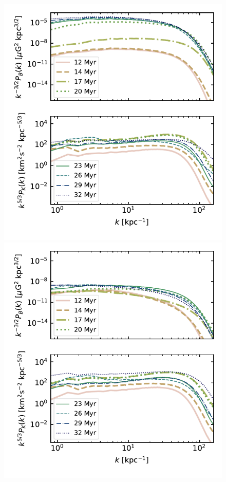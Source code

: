 \documentclass[preprint2]{aastex63}
\begin{document}
\begin{figure}
  \includegraphics[trim=0.5cm 0.2cm 0.3cm 0.0cm, clip=true,width=\columnwidth]{figs/0_5pcPm0e-4_0kpower.pdf}
  \includegraphics[trim=0.5cm 0.5cm 0.3cm 0.0cm, clip=true,width=\columnwidth]{figs/0_5pcPm0e-3_0kpower.pdf}

\end{figure}
\end{document}

